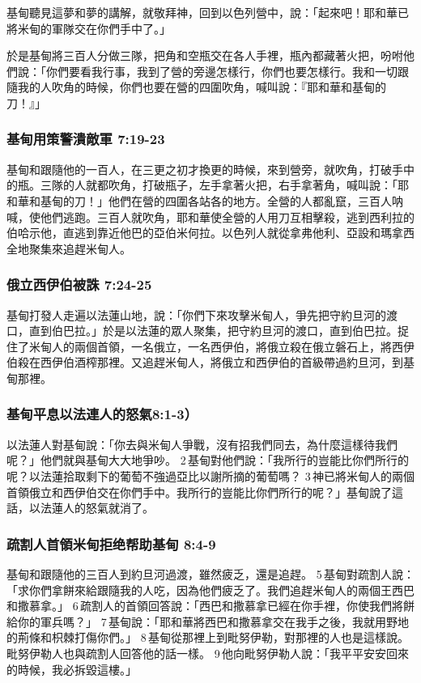基甸聽見這夢和夢的講解，就敬拜神，回到以色列營中，說：「起來吧！耶和華已將米甸的軍隊交在你們手中了。」

於是基甸將三百人分做三隊，把角和空瓶交在各人手裡，瓶內都藏著火把，吩咐他們說：「你們要看我行事，我到了營的旁邊怎樣行，你們也要怎樣行。我和一切跟隨我的人吹角的時候，你們也要在營的四圍吹角，喊叫說：『耶和華和基甸的刀！』」

\subsubsection{基甸用策警潰敵軍 7:19-23}  
基甸和跟隨他的一百人，在三更之初才換更的時候，來到營旁，就吹角，打破手中的瓶。三隊的人就都吹角，打破瓶子，左手拿著火把，右手拿著角，喊叫說：「耶和華和基甸的刀！」他們在營的四圍各站各的地方。全營的人都亂竄，三百人呐喊，使他們逃跑。三百人就吹角，耶和華使全營的人用刀互相擊殺，逃到西利拉的伯哈示他，直逃到靠近他巴的亞伯米何拉。以色列人就從拿弗他利、亞設和瑪拿西全地聚集來追趕米甸人。

\subsubsection{俄立西伊伯被誅 7:24-25}  
基甸打發人走遍以法蓮山地，說：「你們下來攻擊米甸人，爭先把守約旦河的渡口，直到伯巴拉。」於是以法蓮的眾人聚集，把守約旦河的渡口，直到伯巴拉。捉住了米甸人的兩個首領，一名俄立，一名西伊伯，將俄立殺在俄立磐石上，將西伊伯殺在西伊伯酒榨那裡。又追趕米甸人，將俄立和西伊伯的首級帶過約旦河，到基甸那裡。

\subsubsection{基甸平息以法連人的怒氣8:1-3）}  
以法蓮人對基甸說：「你去與米甸人爭戰，沒有招我們同去，為什麼這樣待我們呢？」他們就與基甸大大地爭吵。 2 基甸對他們說：「我所行的豈能比你們所行的呢？以法蓮拾取剩下的葡萄不強過亞比以謝所摘的葡萄嗎？ 3 神已將米甸人的兩個首領俄立和西伊伯交在你們手中。我所行的豈能比你們所行的呢？」基甸說了這話，以法蓮人的怒氣就消了。

\subsubsection{疏割人首領米甸拒绝帮助基甸 8:4-9}  
基甸和跟隨他的三百人到約旦河過渡，雖然疲乏，還是追趕。 5 基甸對疏割人說：「求你們拿餅來給跟隨我的人吃，因為他們疲乏了。我們追趕米甸人的兩個王西巴和撒慕拿。」 6 疏割人的首領回答說：「西巴和撒慕拿已經在你手裡，你使我們將餅給你的軍兵嗎？」 7 基甸說：「耶和華將西巴和撒慕拿交在我手之後，我就用野地的荊條和枳棘打傷你們。」 8 基甸從那裡上到毗努伊勒，對那裡的人也是這樣說。毗努伊勒人也與疏割人回答他的話一樣。 9 他向毗努伊勒人說：「我平平安安回來的時候，我必拆毀這樓。」
   
